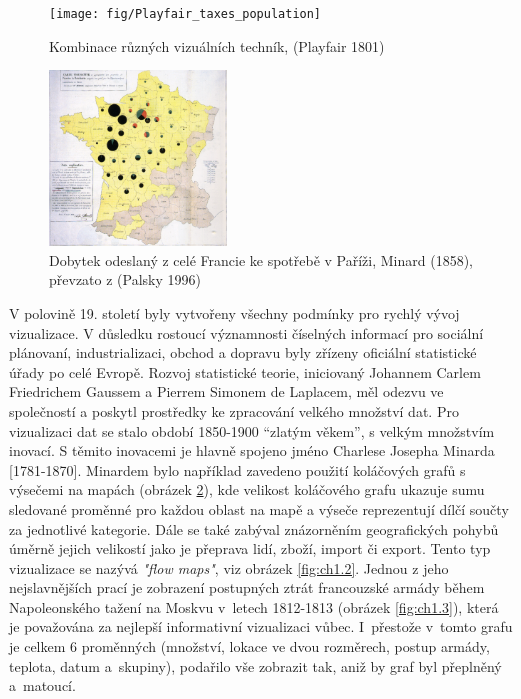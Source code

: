 \documentclass[12pt,]{article}
\begin{document}
\begin{figure}[H]

{\centering \texttt{[image: fig/Playfair\_taxes\_population]} 

}

\caption{\label{fig:ch1.0} Kombinace různých vizuálních techník, (Playfair 1801)}\label{fig:playfair}
\end{figure}

\newpage

\begin{figure}
    \centering
    \includegraphics[width=0.42\textwidth]{fig/Minard_1858}
    \vspace{-5pt}
    \caption{Dobytek odeslaný z celé Francie ke spotřebě v Paříži, Minard (1858), převzato z (Palsky 1996)}
    \label{fig:ch1.1}
\end{figure}

\qquad V polovině 19. století byly vytvořeny všechny podmínky pro rychlý
vývoj vizualizace. V důsledku rostoucí významnosti číselných informací
pro sociální plánovaní, industrializaci, obchod a dopravu byly zřízeny
oficiální statistické úřady po celé Evropě. Rozvoj statistické teorie,
iniciovaný Johannem Carlem Friedrichem Gaussem a Pierrem Simonem de
Laplacem, měl odezvu ve společností a poskytl prostředky ke zpracování
velkého množství dat. Pro vizualizaci dat se stalo období
\mbox{1850-1900} \enquote{zlatým věkem}, s velkým množstvím inovací. S
těmito inovacemi je hlavně spojeno jméno Charlese Josepha Minarda
{[}1781-1870{]}. Minardem bylo například zavedeno použití koláčových
grafů s výsečemi na mapách (obrázek \ref{fig:ch1.1}), kde velikost
koláčového grafu ukazuje sumu sledované proměnné pro každou oblast na
mapě a výseče reprezentují dílčí součty za jednotlivé kategorie. Dále se
také zabýval znázorněním geografických pohybů úměrně jejich velikostí
jako je přeprava lidí, zboží, import či export. Tento typ vizualizace se
nazývá \textit{"flow maps"}, viz obrázek \ref{fig:ch1.2}. Jednou z jeho
nejslavnějších prací je zobrazení postupných ztrát francouzské armády
během Napoleonského tažení na Moskvu v~letech 1812-1813 (obrázek
\ref{fig:ch1.3}), která je považována za nejlepší informativní
vizualizaci vůbec. I~přestože v~tomto grafu je celkem 6 proměnných
(množství, lokace ve dvou rozměrech, postup armády, teplota, datum
a~skupiny), podařilo vše zobrazit tak, aniž by graf byl přeplněný
a~\mbox{matoucí.}
\end{document}
